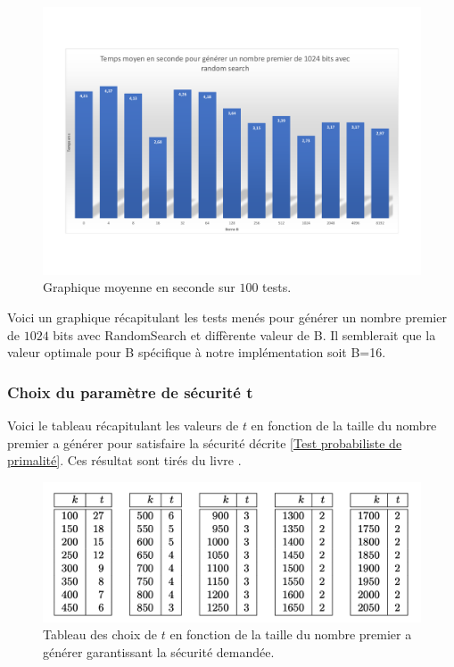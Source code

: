 \begin{figure}[H]
    \centering
    \includegraphics[scale=0.6]{Figures/Graphique.pdf}
    \caption{Graphique moyenne en seconde sur $100$ tests. }
\end{figure}

Voici un graphique récapitulant les tests menés pour générer un nombre premier de $1024$ bits avec RandomSearch et diffèrente valeur de B.
Il semblerait que la valeur optimale pour B spécifique à notre implémentation soit B=16. 

\subsubsection{Choix du paramètre de sécurité t}

Voici le tableau récapitulant les valeurs de $t$ en fonction de la taille du nombre premier a générer pour satisfaire la sécurité décrite \ref{Test probabiliste de primalité}. Ces résultat sont tirés du livre \cite{HAC}.

\begin{figure}[H]
    \centering
    \includegraphics[scale=0.6]{Figures/parametret.png}
    \caption{Tableau des choix de $t$ en fonction de la taille du nombre premier a générer garantissant la sécurité demandée.}
\end{figure}

